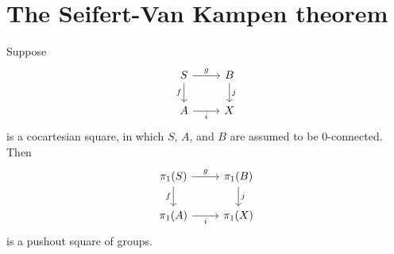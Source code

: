 \chapter{The Seifert-Van Kampen theorem}

\begin{thm}
Suppose
\begin{equation*}
\begin{tikzcd}
S \arrow[r,"g"] \arrow[d,swap,"f"] & B \arrow[d,"j"] \\
A \arrow[r,swap,"i"] & X
\end{tikzcd}
\end{equation*}
is a cocartesian square, in which $S$, $A$, and $B$ are assumed to be $0$-connected. Then 
\begin{equation*}
\begin{tikzcd}
\pi_1(S) \arrow[r,"g"] \arrow[d,swap,"f"] & \pi_1(B) \arrow[d,"j"] \\
\pi_1(A) \arrow[r,swap,"i"] & \pi_1(X)
\end{tikzcd}
\end{equation*}
is a pushout square of groups.
\end{thm}
